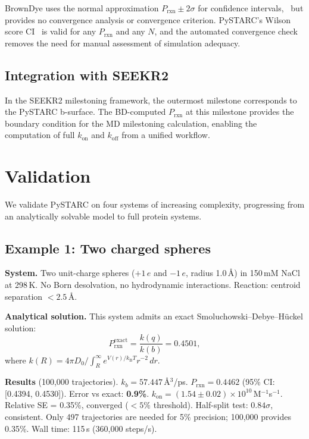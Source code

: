 \documentclass[journal=jctcce,manuscript=article,layout=twocolumn]{achemso}
\newcommand{\kBT}{k_{\mathrm{B}}T}
\newcommand{\kon}{k_{\mathrm{on}}}
\newcommand{\koff}{k_{\mathrm{off}}}
\newcommand{\Prxn}{P_{\mathrm{rxn}}}
\begin{document}
BrownDye uses the normal approximation $\Prxn \pm 2\sigma$ for
confidence intervals,~\cite{Huber2010BrownDye} but provides no
convergence analysis or convergence criterion.
PySTARC's Wilson score CI~\cite{Wilson1927} is valid for any
$\Prxn$ and any $N$, and the automated convergence check
removes the need for manual assessment of simulation adequacy.

\subsection{Integration with SEEKR2}

In the SEEKR2 milestoning framework, the outermost milestone
corresponds to the PySTARC b-surface.
The BD-computed $\Prxn$ at this milestone provides the boundary
condition for the MD milestoning calculation, enabling the
computation of full $\kon$ and $\koff$ from a unified
workflow.


\section{Validation}
\label{sec:validation}

We validate PySTARC on four systems of increasing complexity,
progressing from an analytically solvable model to full protein
systems.

\subsection{Example 1: Two charged spheres}

\textbf{System.}
Two unit-charge spheres ($+1\,e$ and $-1\,e$, radius 1.0\,\AA)
in 150\,mM NaCl at 298\,K.
No Born desolvation, no hydrodynamic interactions.
Reaction: centroid separation $< 2.5$\,\AA.

\textbf{Analytical solution.}
This system admits an exact Smoluchowski--Debye--H\"uckel solution:
\begin{equation}
\Prxn^\mathrm{exact} = \frac{k(q)}{k(b)} = 0.4501,
\label{eq:prxn_exact}
\end{equation}
where $k(R) = 4\pi D_0 / \int_R^\infty e^{V(r)/\kBT} r^{-2}\,dr$.

\textbf{Results} (100{,}000 trajectories).
$k_b = 57.447$\,\AA$^3$/ps.
$\Prxn = 0.4462$ (95\% CI: [0.4394, 0.4530]).
Error vs exact: \textbf{0.9\%}.
$\kon = (1.54 \pm 0.02) \times 10^{10}$\,M$^{-1}$s$^{-1}$.
Relative SE = 0.35\%, converged ($<5\%$ threshold).
Half-split test: $0.84\sigma$, consistent.
Only 497 trajectories are needed for 5\% precision;
100{,}000 provides 0.35\%.
Wall time: 115\,s (360{,}000 steps/s).
\end{document}
